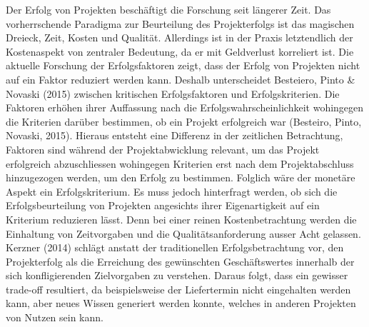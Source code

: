 \newline
Der Erfolg von Projekten beschäftigt die Forschung seit längerer Zeit. Das vorherrschende Paradigma zur Beurteilung des Projekterfolgs ist das magischen Dreieck, Zeit, Kosten und Qualität. Allerdings ist in der Praxis letztendlich der Kostenaspekt von zentraler Bedeutung, da er mit Geldverlust korreliert ist. Die aktuelle Forschung der Erfolgsfaktoren zeigt, dass der Erfolg von Projekten nicht auf ein Faktor reduziert werden kann. Deshalb unterscheidet Besteiero, Pinto \& Novaski (2015) zwischen kritischen Erfolgsfaktoren und Erfolgskriterien. Die Faktoren erhöhen ihrer Auffassung nach die Erfolgswahrscheinlichkeit wohingegen die Kriterien darüber bestimmen, ob ein Projekt erfolgreich war (Besteiro, Pinto, Novaski, 2015). Hieraus entsteht eine Differenz in der zeitlichen Betrachtung, Faktoren sind während der Projektabwicklung relevant, um das Projekt erfolgreich abzuschliessen wohingegen Kriterien erst nach dem Projektabschluss hinzugezogen werden, um den Erfolg zu bestimmen. Folglich wäre der monetäre Aspekt ein Erfolgskriterium. Es muss jedoch hinterfragt werden, ob sich die Erfolgsbeurteilung von Projekten angesichts ihrer Eigenartigkeit auf ein Kriterium reduzieren lässt.  Denn bei einer reinen Kostenbetrachtung werden die Einhaltung von Zeitvorgaben und die Qualitätsanforderung ausser Acht gelassen. Kerzner (2014) schlägt anstatt der traditionellen Erfolgsbetrachtung vor, den Projekterfolg als die Erreichung des gewünschten Geschäftswertes innerhalb der sich konfligierenden Zielvorgaben zu verstehen. Daraus folgt, dass ein gewisser trade-off resultiert, da beispielsweise der Liefertermin nicht eingehalten werden kann, aber neues Wissen generiert werden konnte, welches in anderen Projekten von Nutzen sein kann. 
\newline
